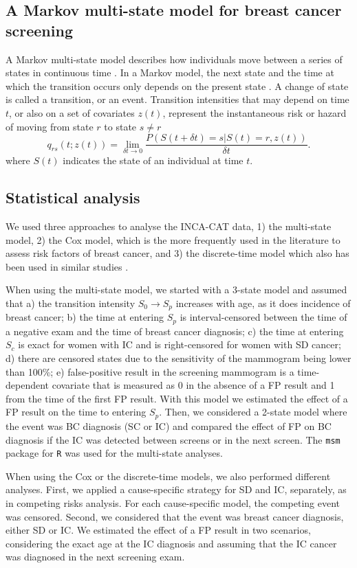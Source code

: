 \documentclass{bmcart}
\begin{document}
\subsection*{A Markov multi-state model for breast cancer screening}
A Markov multi-state model describes how individuals move between a series of states in continuous
time \cite{Jackson2011, Geskus2016}. In a Markov model, the next state and the time at which the
transition occurs only depends on the present state \cite{Putter2007}. A change of state is called
a transition, or an event. Transition intensities that may depend on time $t$, or also on a set of
covariates $z(t)$, represent the instantaneous risk or hazard of moving from state $r$ to state
$s \neq r$
\[q_{rs}(t;z(t)) =  \underset{\delta t \rightarrow 0} {\lim}\frac{P(S(t+\delta t) = s | S(t) = r, z(t))}{\delta t}.\]
where $S(t)$ indicates the state of an individual at time $t$.

\subsection*{Statistical analysis}
We used three approaches to analyse the INCA-CAT data, 1) the multi-state model, 2) the Cox model,
which is the more frequently used in the literature to assess risk factors of breast cancer, and 3)
the discrete-time model which also has been used in similar studies \cite{Blanch2013, Ripping2016}.

When using the multi-state model, we started with a 3-state model and assumed that a) the
transition intensity $S_0 \rightarrow S_p$ increases with age, as it does incidence of breast
cancer; b) the time at entering $S_p$ is interval-censored between the time of a negative exam and
the time of breast cancer diagnosis; c) the time at entering $S_c$ is exact for women with IC and
is right-censored for women with SD cancer; d) there are censored states due to the sensitivity of
the mammogram being lower than 100\%; e) false-positive result in the screening mammogram is a
time-dependent covariate that is measured as 0 in the absence of a FP result and 1 from
the time of the first FP result. With this model we estimated the effect of a FP result
on the time to entering $S_p$. Then, we considered a 2-state model where the event was BC diagnosis
(SC or IC) and compared the effect of FP on BC diagnosis if the IC was detected between screens or
in the next screen. The {\tt msm} package for {\tt R} \cite{Jackson2011} was used for the
multi-state analyses.

When using the Cox or the discrete-time models, we also performed different analyses. First, we
applied a cause-specific strategy for SD and IC, separately, as in competing risks analysis. For
each cause-specific model, the competing event was censored. Second, we considered that the event
was breast cancer diagnosis, either SD or IC. We estimated the effect of a FP result in two
scenarios, considering the exact age at the IC diagnosis and assuming that the IC cancer was
diagnosed in the next screening exam.
\end{document}
